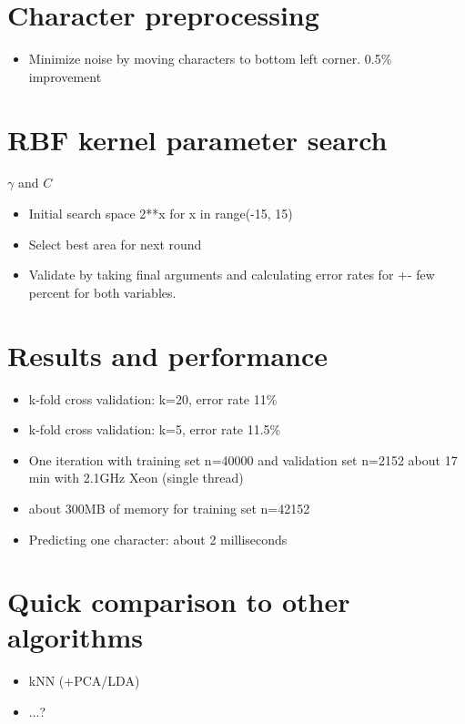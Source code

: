 \documentclass{netsec2012}
\begin{document}
\section{Character preprocessing}

\begin{itemize}
\item Minimize noise by moving characters to bottom left corner. 0.5\% improvement
\end{itemize}

\section{RBF kernel parameter search}

$\gamma$ and $C$

\label{ref:crossvalidation}

\begin{itemize}
\item Initial search space 2**x for x in range(-15, 15)
\item Select best area for next round
\item Validate by taking final arguments and calculating error rates for +- few percent for both variables.
\end{itemize}

\section{Results and performance}

\label{ref:datachallenge}

\begin{itemize}
\item k-fold cross validation: k=20, error rate 11\%
\item k-fold cross validation: k=5, error rate 11.5\%
\item One iteration with training set n=40000 and validation set n=2152 about 17 min with 2.1GHz Xeon (single thread)
\item about 300MB of memory for training set n=42152
\item Predicting one character: about 2 milliseconds

\end{itemize}

\section{Quick comparison to other algorithms}

\begin{itemize}
\item kNN (+PCA/LDA)
\item ...?
\end{itemize}


\cite{albanese12mlpy}



\end{document}
